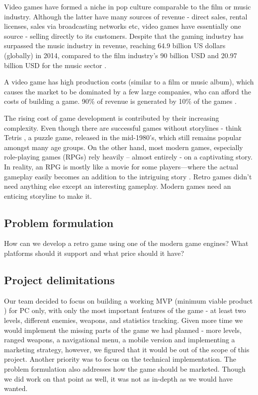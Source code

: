 \documentclass[12p]{article}
\begin{document}
Video games have formed a niche in pop culture comparable to the film or music industry. Although the latter have many sources of revenue - direct sales, rental licenses, sales via broadcasting networks etc, video games have essentially one source - selling directly to its customers. Despite that the gaming industry has surpassed the music industry in revenue, reaching 64.9 billion US dollars (globally) in 2014, compared to the film industry’s 90 billion USD and 20.97 billion USD for the music sector \cite{UnderstandingVideoGames}.

A video game has high production costs (similar to a film or music album), which causes the market to be dominated by a few large companies, who can afford the costs of building a game. 90\% of revenue is generated by 10\% of the games \cite{UnderstandingVideoGames}.

The rising cost of game development is contributed by their increasing complexity. Even though there are successful games without storylines - think Tetris \cite{Tetris}, a puzzle game, released in the mid-1980’s, which still remains popular amongst many age groups. On the other hand, most modern games, especially role-playing games (RPGs) rely heavily – almost entirely - on a captivating story. In reality, an RPG is mostly like a movie for some players—where the actual gameplay easily becomes an addition to the intriguing story \cite{GameDevelopmentEssentials}. Retro games didn’t need anything else except an interesting gameplay. Modern games need an enticing storyline to make it.

\subsection{Problem formulation} \label{ProblemFormulation}

How can we develop a retro game using one of the modern game engines? What platforms should it support and what price should it have?

\subsection{Project delimitations} \label{ProjectDelimitations}

Our team decided to focus on building a working MVP (minimum viable product \cite{MVP}) for PC only, with only the most important features of the game - at least two levels, different enemies, weapons, and statistics tracking. Given more time we would implement the missing parts of the game we had planned - more levels, ranged weapons, a navigational menu, a mobile version and implementing a marketing strategy, however, we figured that it would be out of the scope of this project.
Another priority was to focus on the technical implementation. The problem formulation also addresses how the game should be marketed. Though we did work on that point as well, it was not as in-depth as we would have wanted. 
\end{document}
